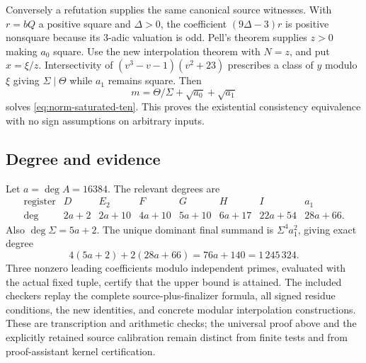 Conversely a refutation supplies the same canonical source witnesses.
With $r=bQ$ a positive square and $\Delta>0$, the coefficient
$(9\Delta-3)r$ is positive nonsquare because its $3$-adic valuation is
odd. Pell's theorem supplies $z>0$ making $a_0$ square. Use the new
interpolation theorem with $N=z$, and put $x=\xi/z$.
Intersectivity of $(v^3-v-1)(v^2+23)$ prescribes a class of $y$ modulo
$\xi$ giving $\Sigma\mid\Theta$ while $a_1$ remains square.
Then
\[
 m=\Theta/\Sigma+\sqrt{a_0}+\sqrt{a_1}
\]
solves \eqref{eq:norm-saturated-ten}. This proves the existential
consistency equivalence with no sign assumptions on arbitrary inputs.

\subsection{Degree and evidence}

Let $a=\deg A=16384$. The relevant degrees are
\[
\begin{array}{c|rrrrrrr}
 \text{register}&D&E_2&F&G&H&I&a_1\\\hline
 \deg&2a+2&2a+10&4a+10&5a+10&6a+17&22a+54&28a+66.
\end{array}
\]
Also $\deg\Sigma=5a+2$. The unique dominant final summand is
$\Sigma^4a_1^2$, giving exact degree
\[
 4(5a+2)+2(28a+66)=76a+140=1\,245\,324.
\]
Three nonzero leading coefficients modulo independent primes, evaluated
with the actual fixed tuple, certify that the upper bound is attained.
The included checkers replay the complete source-plus-finalizer formula,
all signed residue conditions, the new identities, and concrete modular
interpolation constructions. These are transcription and arithmetic
checks; the universal proof above and the explicitly retained source
calibration remain distinct from finite tests and from proof-assistant
kernel certification.

